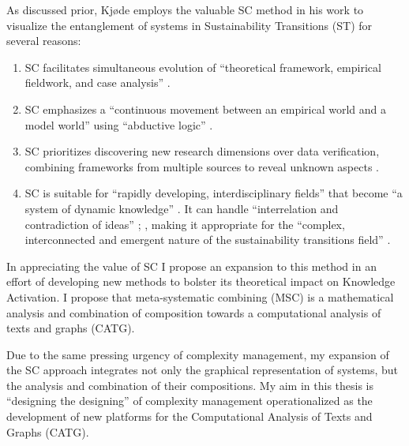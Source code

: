 As discussed prior, Kjøde employs the valuable SC method in his work to visualize the entanglement of systems in Sustainability Transitions (ST) for several reasons: 
\begin{enumerate}
    \item SC facilitates simultaneous evolution of “theoretical framework, empirical fieldwork, and case analysis” \citep[p. 554]{dubois_systematic_2002}.
\item SC emphasizes a ``continuous movement between an empirical world and a model world” \citep[p.554]{dubois_systematic_2002} using ``abductive logic” \citep[p.553]{dubois_systematic_2002}.

\item SC prioritizes discovering new research dimensions over data verification, combining frameworks from multiple sources to reveal unknown aspects \citep[p.552]{dubois_systematic_2002}.

\item SC is suitable for ``rapidly developing, interdisciplinary fields” that become ``a system of dynamic knowledge”  \citep[p. 46]{kjode_entanglement_2024}. It can handle ``interrelation and contradiction of ideas” \citep[p. 46]{kjode_entanglement_2024}; \citep[p. 8]{sevaldson_discussions_2010-1}, making it appropriate for the ``complex, interconnected and emergent nature of the sustainability transitions field” \citep[p. 45]{kjode_entanglement_2024}.

\end{enumerate}
 



In appreciating the value of SC I propose an expansion to this method in an effort of developing new methods to bolster its theoretical impact on Knowledge Activation. I propose that meta-systematic combining (MSC) is a mathematical analysis and combination of composition towards a computational analysis of texts and graphs (CATG). 

Due to the same pressing urgency of complexity management, my expansion of the SC approach integrates not only the graphical representation of systems, but the analysis and combination of their compositions. My aim in this thesis is ``designing the designing” \citep[p. 156]{pangaro_design_2011} of complexity management operationalized as the development of new platforms for the Computational Analysis of Texts and Graphs (CATG). 

